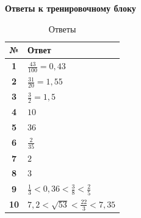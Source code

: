 \documentclass[a4paper,12pt]{article}
\begin{document}

\clearpage
\thispagestyle{plain}

\begin{center}
{\LARGE\bfseries
\textcolor{darkaccent}{Ответы к тренировочному блоку}}
\end{center}

\vspace{0.7cm}

\begin{table}[ht]
\centering
\caption{Ответы}

\begin{tabularx}{\linewidth}{
  @{}
  >{\bfseries}c
  X
  @{}
}
\toprule
№ & Ответ \\
\midrule

1 &
\(\displaystyle
\frac{43}{100}=0{,}43
\)
\\

2 &
\(\displaystyle
\frac{31}{20}=1{,}55
\)
\\

3 &
\(\displaystyle
\frac32=1{,}5
\)
\\

4 &
\(10\)
\\

5 &
\(36\)
\\

6 &
\(\displaystyle
\frac{2}{35}
\)
\\

7 &
\(2\)
\\

8 &
\(3\)
\\

9 &
\(\displaystyle
\frac13<0{,}36<\frac38<\frac25
\)
\\

10 &
\(\displaystyle
7{,}2<\sqrt{53}<\frac{22}{3}<7{,}35
\)
\\

\bottomrule
\end{tabularx}
\end{table}
\end{document}
